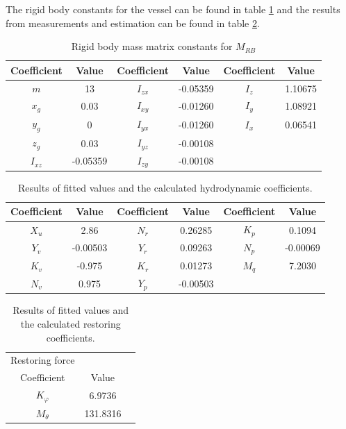 The rigid body constants for the vessel can be found in table \ref{tab:constants} and the results from measurements and estimation can be found in table \ref{tab:dmatrix}.
\begin{table}[htbp]
\centering
\begin{tabular}{cccccc}
	\toprule
  Coefficient & Value & Coefficient & Value & Coefficient & Value  \\
  \midrule
  $m$ & 13 & $I_{zx}$ & -0.05359 & $I_z$ & 1.10675\\
  $x_g$ & 0.03 & $I_{xy}$ & -0.01260 & $I_y$ & 1.08921 \\
  $y_g$ & 0 &  $I_{yx}$ & -0.01260 & $I_x$ & 0.06541\\
  $z_g$ & 0.03 & $I_{yz}$ & -0.00108 &\\
  $I_{xz}$ & -0.05359 & $I_{zy}$ & -0.00108 & \\
  \bottomrule
\end{tabular}
\caption{Rigid body mass matrix constants for $M_{RB}$}
\label{tab:constants}
\end{table}

\begin{table}[htbp]
\centering
\begin{tabular}{cccccc}
  \toprule
  Coefficient & Value & Coefficient & Value & Coefficient & Value \\
  \midrule
  $X_u$ & 2.86 & $N_r$ & 0.26285 & $K_p$ & 0.1094 \\
  $Y_v$ & -0.00503 & $Y_r$ & 0.09263 & $N_p$ & -0.00069 \\
  $K_v$ & -0.975 & $K_r$ & 0.01273 & $M_q$ & 7.2030 \\
  $N_v$ & 0.975 & $Y_p$ & -0.00503 &\\
	\bottomrule
\end{tabular}
\caption{Results of fitted values and the calculated hydrodynamic coefficients.}
\label{tab:dmatrix}
\end{table}

\begin{table}[htbp]
\centering
\begin{tabular}{ccc}
	\toprule
  Restoring force\\Coefficient & Value \\
  \midrule
  $K_\varphi$ & 6.9736 \\
  $M_\theta$ & 131.8316 \\
  	\bottomrule
\end{tabular}
\caption{Results of fitted values and the calculated restoring coefficients.}
\label{tab:gmatrix}
\end{table}

